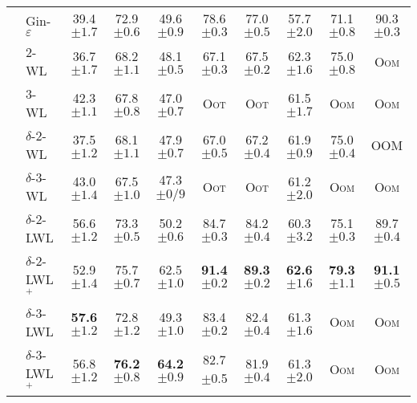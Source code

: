 \documentclass{article}
\theoremstyle{definition}
\begin{document}
\begin{table}[t]
{\begin{tabular}{@{}c <{\enspace}@{}lcccccccc@{}}
			\\ 
			& \textsf{Gin-$\varepsilon$} & 39.4 \scriptsize $\pm 1.7$ &   72.9        \scriptsize	$\pm 0.6 $  & 49.6    \scriptsize $\pm 0.9$& 78.6  \scriptsize $\pm 0.3$ & 77.0  \scriptsize $\pm 0.5$ &  57.7   \scriptsize $\pm 2.0$ &  71.1   \scriptsize  $\pm 0.8$& 90.3  \scriptsize $\pm 0.3$ \\ 
			\cmidrule{2-10}	
			\multirow{4}{*}{\rotatebox{90}{Global}} 	&
			\textsf{$2$-WL}        &   36.7   \scriptsize  $\pm 1.7$ &  68.2  \scriptsize  $\pm 1.1$&  48.1  \scriptsize    $\pm 0.5$&       67.1 \scriptsize  $\pm 0.3$ &  67.5  \scriptsize  $ \pm 0.2$ & 62.3 \scriptsize  $\pm 1.6$ &  75.0   \scriptsize  $\pm 0.8$ & \textsc{Oom} \\
			&  \textsf{$3$-WL}        	&    42.3 \scriptsize $\pm 1.1$& 67.8 \scriptsize $\pm 0.8$ & 47.0   \scriptsize $\pm 0.7$ &\textsc{Oot} &\textsc{Oot} & 61.5    \scriptsize $\pm 1.7$ &\textsc{Oom} & \textsc{Oom} \\            
			\cmidrule{2-10}			
			& \textsf{$\delta$-$2$-WL}  	& 37.5  \scriptsize $\pm 1.2$   &  68.1   \scriptsize $\pm 1.1$&   47.9     \scriptsize  $\pm 0.7$ &      67.0    \scriptsize  $\pm 0.5$ &  67.2   \scriptsize  $\pm 0.4$&   61.9  \scriptsize  $\pm 0.9$& 75.0 \scriptsize  $\pm 0.4$ & \textsc{OOM} \\  
			& \textsf{$\delta$-$3$-WL}          		& 43.0  \scriptsize $\pm 1.4$& 67.5 \scriptsize $\pm 1.0$ &  47.3 \scriptsize $\pm 0/9$ &\textsc{Oot} &\textsc{Oot} &   61.2  \scriptsize $\pm 2.0$ &\textsc{Oom} & \textsc{Oom} \\                                                   
			\cmidrule{2-10}		
			\multirow{4}{*}{\rotatebox{90}{Local}}    		
			& \textsf{$\delta$-$2$-LWL}         	& 56.6    \scriptsize  $\pm 1.2$&  73.3 \scriptsize  $\pm 0.5$ & 50.2 \scriptsize  $\pm 0.6 $& 84.7 \scriptsize  $\pm 0.3$&   84.2   \scriptsize  $\pm 0.4$ & 60.3   \scriptsize  $\pm 3.2$&   75.1  \scriptsize  $\pm 0.3 $& 89.7 \scriptsize        $\pm 0.4$  \\      		
			& \textsf{$\delta$-$2$-LWL$^+$}         	&  52.9  \scriptsize  $\pm 1.4$&  75.7 \scriptsize  $\pm 0.7 $&  62.5   \scriptsize  $\pm 1.0 $&   \bf{91.4}   \scriptsize  $\pm 0.2$ &  \bf{89.3}        \scriptsize  $\pm 0.2$&  \bf{62.6}  \scriptsize  $\pm 1.6$&   \textbf{79.3}    \scriptsize $\pm 1.1 $&   \bf{91.1}    \scriptsize  $\pm 0.5 $\\     
			& \textsf{$\delta$-$3$-LWL} 	&  \bf{57.6}   \scriptsize  $\pm 1.2 $& 72.8 \scriptsize  $\pm  1.2  $&   49.3     \scriptsize  $\pm 1.0 $ &  83.4   \scriptsize  $\pm 0.2  $&  82.4   \scriptsize  $\pm 0.4$ &    61.3    \scriptsize  $\pm 1.6$& \textsc{Oom} & \textsc{Oom} \\ 	
			& \textsf{$\delta$-$3$-LWL$^+$}         	& 56.8   \scriptsize  $\pm 1.2$&  \bf{76.2}     \scriptsize  $\pm  0.8$& \bf{64.2}       \scriptsize  $\pm 0.9 $ &  82.7   \scriptsize  $\pm $0.5 &  81.9   \scriptsize  $\pm 0.4$& 61.3 \scriptsize  $\pm 2.0$& \textsc{Oom}& \textsc{Oom} \\    
			\bottomrule
	\end{tabular}}
\end{table}	
	
\end{document}
